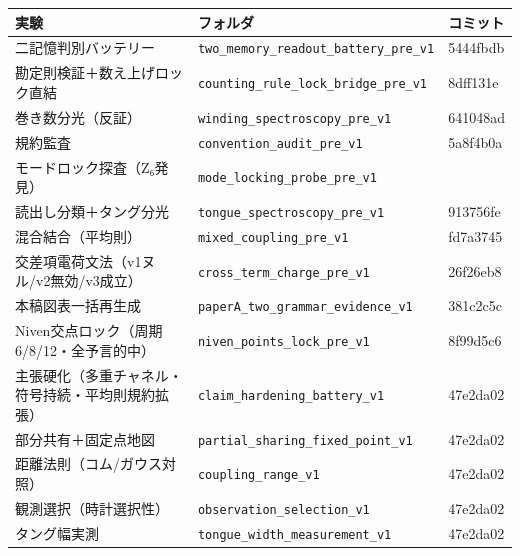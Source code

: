 \documentclass[
  a4paper,
]{ltjsarticle}
\newcounter{none} %
\begin{document}
{\def\LTcaptype{none} %
\begin{longtable}[]{@{}
  >{\raggedright\arraybackslash}p{}
  >{\raggedright\arraybackslash}p{}
  >{\raggedright\arraybackslash}p{}@{}}
\toprule\noalign{}
\begin{minipage}[b]{\linewidth}\raggedright
実験
\end{minipage} & \begin{minipage}[b]{\linewidth}\raggedright
フォルダ
\end{minipage} & \begin{minipage}[b]{\linewidth}\raggedright
コミット
\end{minipage} \\
\midrule\noalign{}
\endhead
\bottomrule\noalign{}
\endlastfoot
二記憶判別バッテリー & \texttt{two\_memory\_readout\_battery\_pre\_v1} &
5444fbdb \\
勘定則検証＋数え上げロック直結 &
\texttt{counting\_rule\_lock\_bridge\_pre\_v1} & 8dff131e \\
巻き数分光（反証） & \texttt{winding\_spectroscopy\_pre\_v1} &
641048ad \\
規約監査 & \texttt{convention\_audit\_pre\_v1} & 5a8f4b0a \\
モードロック探査（Z₆発見） & \texttt{mode\_locking\_probe\_pre\_v1} &
56453653 \\
読出し分類＋タング分光 & \texttt{tongue\_spectroscopy\_pre\_v1} &
913756fe \\
混合結合（平均則） & \texttt{mixed\_coupling\_pre\_v1} & fd7a3745 \\
交差項電荷文法（v1ヌル/v2無効/v3成立） &
\texttt{cross\_term\_charge\_pre\_v1} & 26f26eb8 \\
本稿図表一括再生成 & \texttt{paperA\_two\_grammar\_evidence\_v1} &
381c2c5c \\
Niven交点ロック（周期6/8/12・全予言的中） &
\texttt{niven\_points\_lock\_pre\_v1} & 8f99d5c6 \\
主張硬化（多重チャネル・符号持続・平均則規約拡張） &
\texttt{claim\_hardening\_battery\_v1} & 47e2da02 \\
部分共有＋固定点地図 & \texttt{partial\_sharing\_fixed\_point\_v1} &
47e2da02 \\
距離法則（コム/ガウス対照） & \texttt{coupling\_range\_v1} & 47e2da02 \\
観測選択（時計選択性） & \texttt{observation\_selection\_v1} &
47e2da02 \\
タング幅実測 & \texttt{tongue\_width\_measurement\_v1} & 47e2da02 \\
\end{longtable}
}
\end{document}
